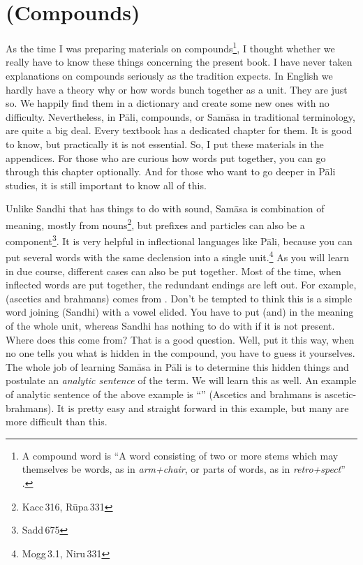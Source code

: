\chapter{ (Compounds)}\label{chap:samasa}

As the time I was preparing materials on compounds\footnote{A compound word is ``A word consisting of two or more stems which may themselves be words, as in \emph{arm+chair}, or parts of words, as in \emph{retro+spect}'' \citep[p.~93]{brownmiller:dict}.}, I thought whether we really have to know these things concerning the present book. I have never taken explanations on compounds seriously as the tradition expects. In English we hardly have a theory why or how words bunch together as a unit. They are just so. We happily find them in a dictionary and create some new ones with no difficulty. Nevertheless, in P\=ali, compounds, or Sam\=asa in traditional terminology, are quite a big deal. Every textbook has a dedicated chapter for them. It is good to know, but practically it is not essential. So, I put these materials in the appendices. For those who are curious how words put together, you can go through this chapter optionally. And for those who want to go deeper in P\=ali studies, it is still important to know all of this.

Unlike Sandhi that has things to do with sound, Sam\=asa is combination of meaning, mostly from nouns\footnote{Kacc\,316, R\=upa\,331}, but prefixes and particles can also be a component\footnote{Sadd\,675}. It is very helpful in inflectional languages like P\=ali, because you can put several words with the same declension into a single unit.\footnote{Mogg\,3.1, Niru\,331} As you will learn in due course, different cases can also be put together. Most of the time, when inflected words are put together, the redundant endings are left out. For example,  (ascetics and brahmans) comes from . Don't be tempted to think this is a simple word joining (Sandhi) with a vowel elided. You have to put  (and) in the meaning of the whole unit, whereas Sandhi has nothing to do with  if it is not present. Where does this  come from? That is a good question. Well, put it this way, when no one tells you what is hidden in the compound, you have to guess it yourselves. The whole job of learning Sam\=asa in P\=ali is to determine this hidden things and postulate an \emph{analytic sentence} of the term. We will learn this as well. An example of analytic sentence of the above example is ``'' (Ascetics and brahmans is ascetic-brahmans). It is pretty easy and straight forward in this example, but many are more difficult than this.

